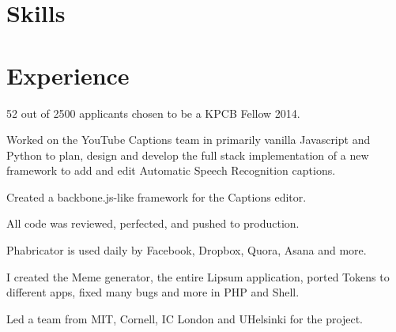 \documentclass[letterpaper]{deedy-resume} %
\newcommand{\skill}[1]{\runsubsection{#1}}
\begin{document}
\begin{minipage}[t]{0.66\textwidth} %


\section{Skills}
\skill{} 


\sectionspace


\section{Experience}

\subtitle{| KPCB Fellow + Software Engineering Intern}

\vspace{\topsep} %
\begin{tightitemize}
\item 52 out of 2500 applicants chosen to be a KPCB Fellow 2014.
\end{tightitemize}

\sectionspace


\subtitle{| Software Engineering Intern}

\begin{tightitemize}
\item Worked on the YouTube Captions team in primarily vanilla Javascript and Python to plan, design and develop the full stack implementation of a new framework to add and edit Automatic Speech Recognition captions.
\item Created a backbone.js-like framework for the Captions editor.
\item All code was reviewed, perfected, and pushed to production.
\end{tightitemize}

\sectionspace


\subtitle{| Open Source Contributor \& Team Leader}

\begin{tightitemize}
\item Phabricator is used daily by Facebook, Dropbox, Quora, Asana and more.
\item I created the Meme generator, the entire Lipsum application, ported Tokens to different apps, fixed many bugs and more in PHP and Shell.
\item Led a team from MIT, Cornell, IC London and UHelsinki for the project.
\end{tightitemize}


\end{minipage}
\end{document}
